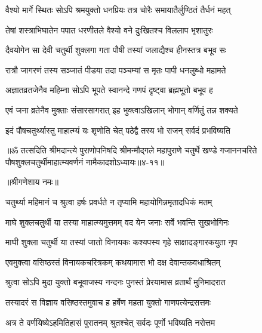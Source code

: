 \twolineshloka
{वैश्यो मार्गे स्थितः सोऽपि श्रमयुक्तो धनप्रियः}
{तत्र चोरैः समायातैर्लुण्ठितं तैर्धनं महत्} %

\twolineshloka
{तेषां शस्त्राभिघातेन पपात धरणीतले}
{वैश्यो वने दुःखितश्च विललाप भृशातुरः} %

\twolineshloka
{दैवयोगेन सा देवी चतुर्थी शुक्लगा गता}
{पौषी तस्यां जलाद्यैश्च हीनस्तत्र बभूव सः} %

\twolineshloka
{रात्रौ जागरणं तस्य सञ्जातं पीडया तदा}
{पञ्चम्यां स मृतः पापी धनलुब्धो महामते} %

\twolineshloka
{अज्ञातव्रतजेनैव महिम्ना सोऽपि भूपते}
{स्वानन्दे गणपं दृष्ट्वा ब्रह्मभूतो बभूव ह} %

\twolineshloka
{एवं जना व्रतेनैव मुक्ताः संसारसागरात्}
{इह भुक्त्वाऽखिलान् भोगान् वर्णितुं तन्न शक्यते} %

\twolineshloka
{इदं पौषचतुर्थ्यास्तु माहात्म्यं यः श‍ृणोति चेत्}
{पठेद्वै तस्य भो राजन् सर्वदं प्रभविष्यति} %

॥ॐ तत्सदिति श्रीमदान्त्ये पुराणोपनिषदि श्रीमन्मौद्गले महापुराणे चतुर्थे खण्डे गजाननचरिते पौषशुक्लचतुर्थीमाहात्म्यवर्णनं नामैकादशोऽध्यायः॥४-११॥


\label{sec:magha-shukla-chaturthi-mahatmya-varnanam}

\centerline{॥श्रीगणेशाय नमः॥}


\twolineshloka
{चतुर्थ्या महिमानं च श्रुत्वा हर्षः प्रवर्धते}
{न तृप्यामि महायोगिन्नमृतादधिकं मतम्} %

\twolineshloka
{माघे शुक्लचतुर्थी या तस्या माहात्म्यमुत्तमम्}
{वद येन जनाः सर्वे भवन्ति सुखभोगिनः} %


\twolineshloka
{माघी शुक्ला चतुर्थी या तस्यां जातो विनायकः}
{कश्यपस्य गृहे साक्षादङ्गारकयुता नृप} %


\twolineshloka
{एवमुक्त्वा वसिष्ठस्तं विनायकचरित्रकम्}
{कथयामास भो दक्ष देवान्तकवधाश्रितम्} %

\twolineshloka
{श्रुत्वा सोऽपि मुदा युक्तो बभूवाजस्य नन्दनः}
{पुनस्तं प्रेरयामास व्रतार्थं मुनिमादरात} %

\twolineshloka
{तस्यादरं स विज्ञाय वसिष्ठस्तमुवाच ह}
{हर्षेण महता युक्तो गाणपत्येन्द्रसत्तमः} %


\twolineshloka
{अत्र ते वर्णयिष्येऽहमितिहासं पुरातनम्}
{श्रुतश्चेत् सर्वदः पूर्णो भविष्यति नरोत्तम} %

